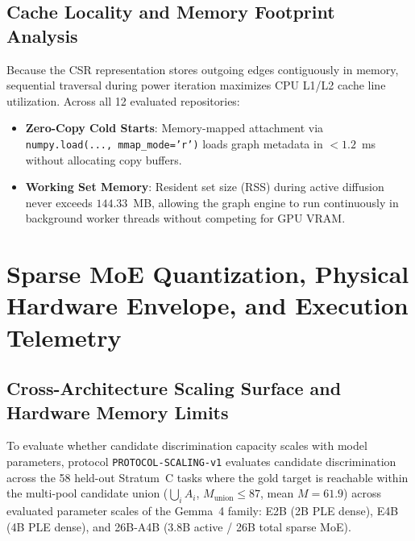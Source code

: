 \documentclass[10pt]{article}
\begin{document}
\subsection{Cache Locality and Memory Footprint Analysis}
Because the CSR representation stores outgoing edges contiguously in memory, sequential traversal during power iteration maximizes CPU L1/L2 cache line utilization. Across all 12 evaluated repositories:
\begin{itemize}[noitemsep,topsep=2pt,parsep=0pt,partopsep=0pt]
    \item \textbf{Zero-Copy Cold Starts}: Memory-mapped attachment via \texttt{numpy.load(..., mmap\_mode='r')} loads graph metadata in $<1.2$~ms without allocating copy buffers.
    \item \textbf{Working Set Memory}: Resident set size (RSS) during active diffusion never exceeds $144.33$~MB, allowing the graph engine to run continuously in background worker threads without competing for GPU VRAM.
\end{itemize}


\section{Sparse MoE Quantization, Physical Hardware Envelope, and Execution Telemetry}
\label{app:moe_quantization}

\subsection{Cross-Architecture Scaling Surface and Hardware Memory Limits}
To evaluate whether candidate discrimination capacity scales with model parameters, protocol \texttt{PROTOCOL\allowbreak -SCALING\allowbreak -v1} evaluates candidate discrimination across the 58 held-out Stratum~C tasks where the gold target is reachable within the multi-pool candidate union ($\bigcup_i A_i$, $M_{\text{union}} \le 87$, mean $M=61.9$) across evaluated parameter scales of the Gemma~4 family: E2B (2B PLE dense), E4B (4B PLE dense), and 26B-A4B (3.8B active / 26B total sparse MoE).
\end{document}
